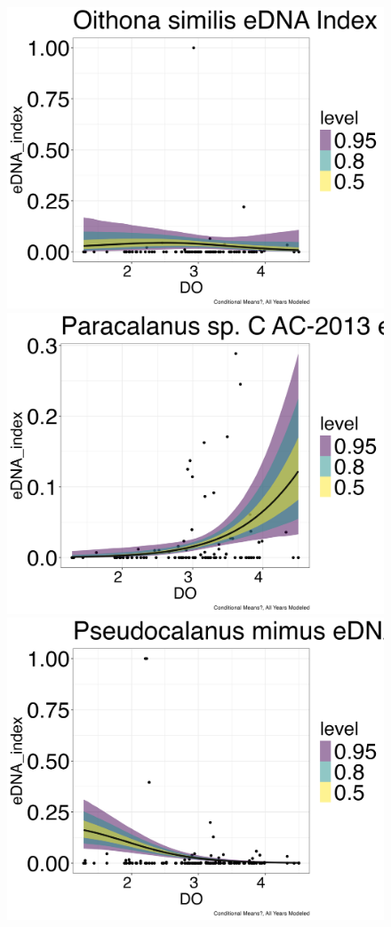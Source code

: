 \documentclass[12pt,twoside]{reedthesis}
\begin{document}
\begin{figure}[h]
\begin{center}
			\includegraphics[scale=0.25]{Osimilis_ZOIB_Means_Mod_noOut}
			\includegraphics[scale=0.25]{Paracalanus_ZOIB_Means_Mod_noOut}
			\includegraphics[scale=0.25]{Pmimus_ZOIB_Means_Mod_noOut}

\end{center}
\end{figure}
\end{document}
